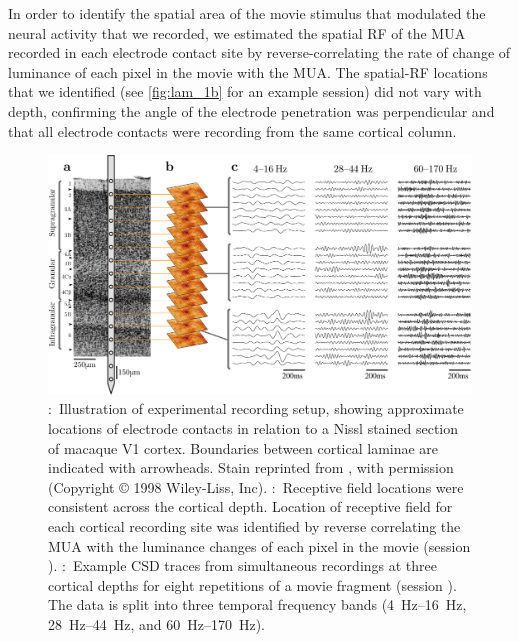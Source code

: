 In order to identify the spatial area of the movie stimulus that modulated the neural activity that we recorded, we estimated the spatial \ac{RF} of the \ac{MUA} recorded in each electrode contact site by reverse-correlating the rate of change of luminance of each pixel in the movie with the \ac{MUA}.
The spatial-\ac{RF} locations that we identified (see \autoref{fig:lam_1b} for an example session) did not vary with depth, confirming the angle of the electrode penetration was perpendicular and that all electrode contacts were recording from the same cortical column.


\begin{figure}[htbp]
\subfloat{\label{fig:lam_1a}}
\subfloat{\label{fig:lam_1b}}
\subfloat{\label{fig:lam_1c}}
\centering \includegraphics[width=\columnwidth]{paperfigs/fig1.pdf}
%
\caption{
\protect{}:~Illustration of experimental recording setup, showing approximate locations of electrode contacts in relation to a Nissl stained section of macaque \ac{V1} cortex.
Boundaries between cortical laminae are indicated with arrowheads.
Stain reprinted from \citet{Tyler1998}, with permission (Copyright \copyright{} 1998 Wiley-Liss, Inc).
\protect{}:~Receptive field locations were consistent across the cortical depth.
Location of receptive field for each cortical recording site was identified by reverse correlating the \ac{MUA} with the luminance changes of each pixel in the movie (session ).
\protect{}:~Example \ac{CSD} traces from simultaneous recordings at three cortical depths for eight repetitions of a movie fragment (session ).
The data is split into three temporal frequency bands (\SIrange{4}{16}{Hz}, \SIrange{28}{44}{Hz}, and \SIrange{60}{170}{Hz}).
}%
\label{fig:lam_1}
%
\end{figure}


